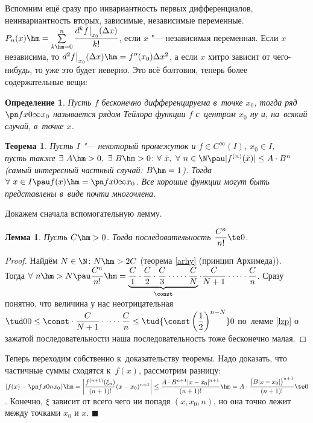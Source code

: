 \documentclass[a4paper,10pt,twoside]{article}
\newtheorem{Def}{Определение}[section]
\newtheorem{Th}{Лемма}[section]
\newtheorem{The}{Теорема}[section]
\newenvironment{Proof}
       {\par\noindent{\textbf{Доказательство.}}}
       {\hfill$\scriptstyle\blacksquare$}
\begin{document}
Вспомним ещё сразу про инвариантность первых дифференциалов, неинвариантность вторых, зависимые, независимые переменные. $P_n(x)\hm=\sum\limits_{k\hm=0}^n
\dfrac{d^kf\big|_{x_0}(\Delta x)}{k!}$, если $x$ "--- независимая переменная. Если $x$ независима, то $d^2f\big|_{x_0}(\Delta x)\hm=f''(x_0)\Delta x^2$, а
если $x$ хитро зависит от чего-нибудь, то уже это будет неверно. Это всё болтовня, теперь более содержательные вещи:

\begin{Def}
    Пусть $f$ бесконечно дифференцируема в~точке $x_0$, тогда ряд $\pn fx0{\infty}{x_0}$ называется рядом Тейлора функции $f$  с~центром $x_0$ ну и, на~всякий
    случай, в~точке $x$.
\end{Def}

\begin{The}
    Пусть $I$ "--- некоторый промежуток и $f\in C^\infty(I),\ x_0\in I$,\\ пусть также $\exists\  A\hm>0,\ \exists\  B\hm>0\colon \forall\  \tilde x,\ \forall\  n\in\N
    \pau|f^{(n)}(\tilde x)|\leq A\cdot B^n$ (самый интересный частный случай: $B\hm=1$). Тогда $\forall\  x\in I\pau
    f(x)\hm=\pn fx0{\infty}{x_0}$. Все хорошие функции могут быть представлены в~виде почти многочлена.
\end{The}

\begin{Proof}
    Докажем сначала вспомогательную лемму.

    \begin{Th}
        Пусть $C\hm>0$. Тогда последовательность $\dfrac{C^n}{n!}\te 0$.
    \end{Th}

    \begin{proof}
        Найдём $N\in\N\colon N\hm>2C$ \big(теорема \ref{arhy} (принцип Архимеда)\big).\\ Тогда $\forall\  n\hm>N\pau \dfrac{C^n}{n!}\hm=\underbrace{\dfrac C1\cdot\dfrac C2\cdot \dfrac C3\cdot \dots\cdot\dfrac CN}_{\const}
        \cdot\dfrac C{N+1}\cdot \dots\cdot\dfrac Cn$. Сразу понятно, что величина у нас неотрицательная $\tud00\leq\const\cdot\dfrac C{N+1}\cdot\dots\cdot\dfrac Cn\leq
        \tud{\const\left(\dfrac12\right)^{n-N}}0$ по~лемме \ref{lzp} о зажатой последовательности наша последовательность тоже бесконечно малая.
    \end{proof}

    Теперь переходим собственно к~доказательству теоремы. Надо доказать, что частичные суммы сходятся к~$f(x)$, рассмотрим разницу:
    $\left|f(x)-\pn fx0n{x_0}\right|\hm=\left|\dfrac{f^{(n+1)}(\xi_n)}{(n+1)!}(x-x_0)^{n+1}\right|\leq\dfrac{A\cdot B^{n+1}|x-x_0|^{n+1}}{(n+1)!}\hm=
    A\cdot\dfrac{\big(B|x-x_0|\big)^{n+1}}{(n+1)!}\te0$. Конечно, $\xi$ зависит от всего чего ни попадя $(x,x_0,n)$, но она точно лежит между точками $x_0$ и $x$.
\end{Proof}
\end{document}
